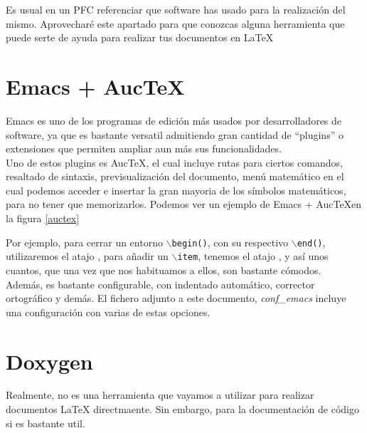 
Es usual en un PFC referenciar que software has usado para la
realización del mismo. Aprovecharé este apartado para que conozcas
alguna herramienta que puede serte de ayuda para realizar tus
documentos en \LaTeX{}

\section*{Emacs + Auc\TeX}

Emacs es uno de los programas de edición más usados por
desarrolladores de software, ya que es bastante versatil admitiendo
gran cantidad de ``plugins'' o extensiones que permiten ampliar aun
más sus funcionalidades.\\

Uno de estos plugins es Auc\TeX \cite{pdf:hierbas}, el cual incluye
rutas para ciertos comandos, resaltado de sintaxis, previsualización
del documento, menú matemático en el cual podemos acceder e insertar
la gran mayoria de los símbolos matemáticos, para no tener que
memorizarlos. Podemos ver un ejemplo de Emacs + Auc\TeX en la figura
\ref{auctex}


Por ejemplo, para cerrar un entorno $\backslash$\texttt{begin()}, con su
respectivo $\backslash$\texttt{end()}, utilizaremos el atajo
\comando{C-c M-]}, para añadir un $\backslash$\texttt{item}, tenemos
el atajo , y así unos cuantos, que una vez que nos
habituamos a ellos, son bastante cómodos.\\

Además, es bastante configurable, con indentado automático, corrector
ortográfico y demás. El fichero adjunto a este documento,
\emph{conf\_emacs} incluye una configuración con varias de estas
opciones.

\section*{Doxygen}

Realmente,  \cite{website:asterisk} no es una herramienta
que vayamos a utilizar para realizar documentos \LaTeX{}
directmaente. Sin embargo, para la documentación de código si es
bastante util.\\

